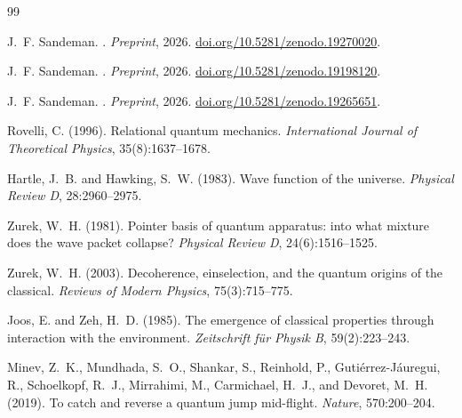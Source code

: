 \documentclass[11pt,a4paper]{article}
\theoremstyle{plain}
\theoremstyle{definition}
\theoremstyle{remark}
\begin{document}
\begin{thebibliography}{99}

J.~F. Sandeman.
.
\newblock \textit{Preprint}, 2026.
\newblock \href{https://doi.org/10.5281/zenodo.19270020}{doi.org/10.5281/zenodo.19270020}.


J.~F. Sandeman.
.
\newblock \textit{Preprint}, 2026.
\newblock \href{https://doi.org/10.5281/zenodo.19198120}{doi.org/10.5281/zenodo.19198120}.


J.~F. Sandeman.
.
\newblock \textit{Preprint}, 2026.
\newblock \href{https://doi.org/10.5281/zenodo.19265651}{doi.org/10.5281/zenodo.19265651}.


Rovelli, C. (1996).
\newblock Relational quantum mechanics.
\newblock \emph{International Journal of Theoretical Physics}, 35(8):1637--1678.

Hartle, J.~B. and Hawking, S.~W. (1983).
\newblock Wave function of the universe.
\newblock \emph{Physical Review D}, 28:2960--2975.

Zurek, W.~H. (1981).
\newblock Pointer basis of quantum apparatus: into what mixture does the wave packet collapse?
\newblock \emph{Physical Review D}, 24(6):1516--1525.

Zurek, W.~H. (2003).
\newblock Decoherence, einselection, and the quantum origins of the classical.
\newblock \emph{Reviews of Modern Physics}, 75(3):715--775.

Joos, E. and Zeh, H.~D. (1985).
\newblock The emergence of classical properties through interaction with the environment.
\newblock \emph{Zeitschrift f\"{u}r Physik B}, 59(2):223--243.

Minev, Z.~K., Mundhada, S.~O., Shankar, S., Reinhold, P.,
  Guti\'{e}rrez-J\'{a}uregui, R., Schoelkopf, R.~J., Mirrahimi, M.,
  Carmichael, H.~J., and Devoret, M.~H. (2019).
\newblock To catch and reverse a quantum jump mid-flight.
\newblock \emph{Nature}, 570:200--204.


\end{thebibliography}
\end{document}
